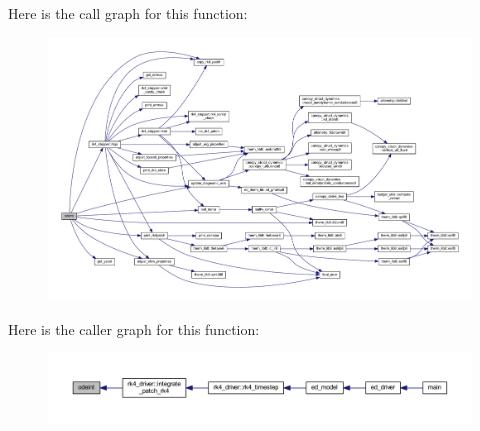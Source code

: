 Here is the call graph for this function\+:\nopagebreak
\begin{figure}[H]
\begin{center}
\leavevmode
\includegraphics[width=350pt]{rk4__integ__utils_8f90_a313e8e2de84e6d5ebc4d9a9024066db1_cgraph}
\end{center}
\end{figure}




Here is the caller graph for this function\+:\nopagebreak
\begin{figure}[H]
\begin{center}
\leavevmode
\includegraphics[width=350pt]{rk4__integ__utils_8f90_a313e8e2de84e6d5ebc4d9a9024066db1_icgraph}
\end{center}
\end{figure}


